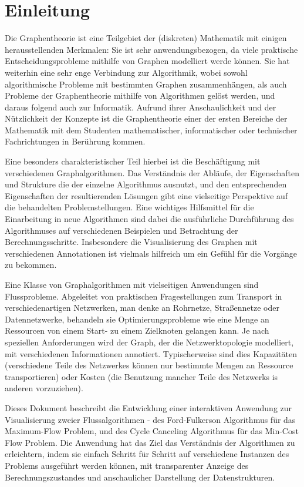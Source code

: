 \chapter*{Einleitung}

Die Graphentheorie ist eine Teilgebiet der (diskreten) Mathematik mit einigen herausstellenden Merkmalen: Sie ist sehr anwendungsbezogen, da viele praktische Entscheidungsprobleme mithilfe von Graphen modelliert werde können. Sie hat weiterhin eine sehr enge Verbindung zur Algorithmik, wobei sowohl algorithmische Probleme mit bestimmten Graphen zusammenhängen, als auch Probleme der Graphentheorie mithilfe von Algorithmen gelöst werden, und daraus folgend auch zur Informatik. Aufrund ihrer Anschaulichkeit und der Nützlichkeit der Konzepte ist die Graphentheorie einer der ersten Bereiche der Mathematik mit dem Studenten mathematischer, informatischer oder technischer Fachrichtungen in Berührung kommen.

Eine besonders charakteristischer Teil hierbei ist die Beschäftigung mit verschiedenen Graphalgorithmen. Das Verständnis der Abläufe, der Eigenschaften und Strukture die der einzelne Algorithmus ausnutzt, und den entsprechenden Eigenschaften der resultierenden Lösungen gibt eine vielseitige Perspektive auf die behandelten Problemstellungen. Eine wichtiges Hilfsmittel für die Einarbeitung in neue Algorithmen sind dabei die ausführliche Durchführung des Algorithmuses auf verschiedenen Beispielen und Betrachtung der Berechnungsschritte. Insbesondere die Visualisierung des Graphen mit verschiedenen Annotationen ist vielmals hilfreich um ein Gefühl für die Vorgänge zu bekommen.

Eine Klasse von Graphalgorithmen mit vielseitigen Anwendungen sind Flussprobleme. Abgeleitet von praktischen Fragestellungen zum Transport in verschiedenartigen Netzwerken, man denke an Rohrnetze, Straßennetze oder Datennetzwerke, behandeln sie Optimierungsprobleme wie eine Menge an Ressourcen von einem Start- zu einem Zielknoten gelangen kann. Je nach speziellen Anforderungen wird der Graph, der die Netzwerktopologie modelliert, mit verschiedenen Informationen annotiert. Typischerweise sind dies Kapazitäten (verschiedene Teile des Netzwerkes können nur bestimmte Mengen an Ressource transportieren) oder Kosten (die Benutzung mancher Teile des Netzwerks is anderen vorzuziehen).

Dieses Dokument beschreibt die Entwicklung einer interaktiven Anwendung zur Visualisierung zweier Flussalgorithmen - des Ford-Fulkerson Algorithmus für das Maximum-Flow Problem, und des Cycle Canceling Algorithmus für das Min-Cost Flow Problem. Die Anwendung hat das Ziel das Verständnis der Algorithmen zu erleichtern, indem sie einfach Schritt für Schritt auf verschiedene Instanzen des Problems ausgeführt werden können, mit transparenter Anzeige des Berechnungszustandes und anschaulicher Darstellung der Datenstrukturen. 

